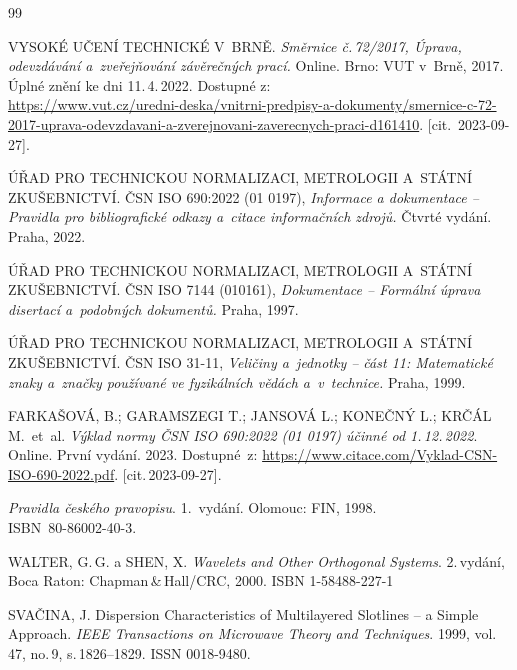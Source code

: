 

\begin{thebibliography}{99}
	
	VYSOKÉ UČENÍ TECHNICKÉ V~BRNĚ.
	\emph{Směrnice č.\,72/2017, Úprava, odevzdávání a~zveřejňování závěrečných prací.}
	Online. Brno: VUT v~Brně, 2017.
	Úplné znění ke dni 11.\,4.\,2022.
	Dostupné z:\\
	{\small
	\url{https://www.vut.cz/uredni-deska/vnitrni-predpisy-a-dokumenty/smernice-c-72-2017-uprava-odevzdavani-a-zverejnovani-zaverecnych-praci-d161410}.}
	[cit.\ 2023-09-27].

    ÚŘAD PRO TECHNICKOU NORMALIZACI, METROLOGII A~STÁTNÍ ZKUŠEBNICTVÍ.
    ČSN ISO 690:2022 (01 0197), \emph{Informace a dokumentace -- Pravidla pro bibliografické odkazy a~citace informačních zdrojů.}
    Čtvrté vydání. Praha, 2022.

    ÚŘAD PRO TECHNICKOU NORMALIZACI, METROLOGII A~STÁTNÍ ZKUŠEBNICTVÍ.
    ČSN ISO 7144 (010161), \emph{Dokumentace -- Formální úprava disertací a~podobných dokumentů.}
    Praha, 1997.

    ÚŘAD PRO TECHNICKOU NORMALIZACI, METROLOGII A~STÁTNÍ ZKUŠEBNICTVÍ.
    ČSN ISO 31-11, \emph{Veličiny a~jednotky -- část 11: Matematické znaky a~značky používané ve fyzikálních vědách a~v~technice.}
    Praha, 1999.

	FARKAŠOVÁ, B.; GARAMSZEGI T.; JANSOVÁ L.; KONEČNÝ L.; KRČÁL M.\ et~al.
	\emph{Výklad normy ČSN ISO 690:2022 (01 0197) účinné od 1.\,12.\,2022}.
	 Online. První vydání. 2023.
	Dostupné~z:
	\url{https://www.citace.com/Vyklad-CSN-ISO-690-2022.pdf}.
	[cit.\,2023-09-27].

    \emph{Pravidla českého pravopisu}.
	1.\ vydání. Olomouc: FIN, 1998.\\
	\mbox{ISBN 80-86002-40-3}.

	WALTER, G.\,G. a SHEN, X.
	\emph{Wavelets and Other Orthogonal Systems}.
	2.\,vydání, Boca Raton: Chapman\,\&\,Hall/CRC, 2000.
	ISBN 1-58488-227-1

	SVAČINA, J.
	Dispersion Characteristics of Multilayered Slotlines -- a Simple Approach.
	\emph{IEEE Transactions on Microwave Theory and Techniques}.
	1999, vol.\,47, no.\,9, s.\,1826--1829. ISSN 0018-9480.


\end{thebibliography}
